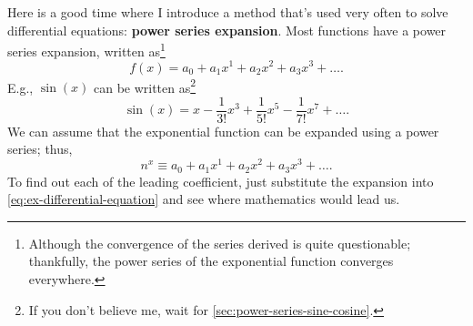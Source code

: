 Here is a good time where I introduce a method that's used very often to solve differential equations: \textbf{power series expansion}. Most functions have a power series expansion, written as\footnote{Although the convergence of the series derived is quite questionable; thankfully, the power series of the exponential function converges everywhere.}
\begin{equation}
	f(x) = a_0 + a_1x^1 + a_2x^2 + a_3x^3 + \dots.
\end{equation}
E.g., $\sin(x)$ can be written as\footnote{If you don't believe me, wait for \cref{sec:power-series-sine-cosine}.}
\begin{equation}
	\sin(x) = x - \frac{1}{3!}x^3 + \frac{1}{5!}x^5 - \frac{1}{7!}x^7 + \dots.
\end{equation}
We can assume that the exponential function can be expanded using a power series; thus,
\begin{equation}
	n^x \equiv a_0 + a_1x^1 + a_2x^2 + a_3x^3 + \dots.
\end{equation}
To find out each of the leading coefficient, just substitute the expansion into \cref{eq:ex-differential-equation} and see where mathematics would lead us.

